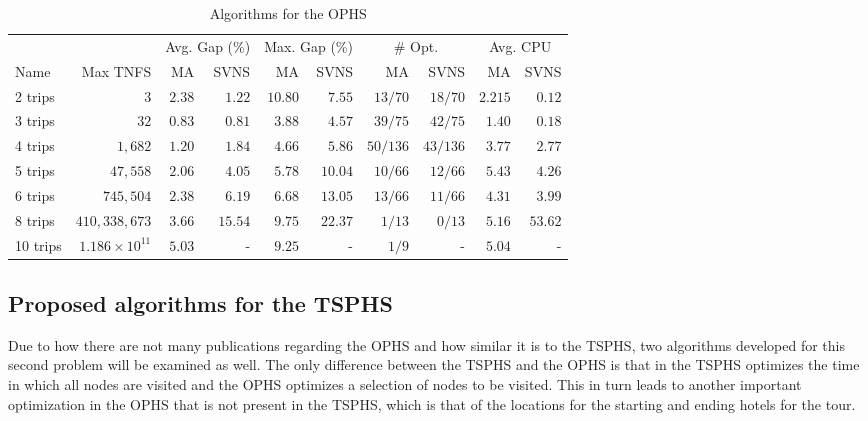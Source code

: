     \begin{center}
        \begin{table}[]
            \centering
            \begin{tabular}{|lr|rr|rr|rr|rr|}
                \hline \multicolumn{2}{|c|}{} & 
                \multicolumn{2}{c|}{Avg. Gap (\%)} & \multicolumn{2}{c|}{Max. Gap (\%)} &
                \multicolumn{2}{c|}{\# Opt.} &
                \multicolumn{2}{c|}{Avg. CPU}\\
                Name & Max TNFS & MA & SVNS & MA & SVNS & MA & SVNS & MA & SVNS  \\
                \hline
                2 trips  & $3$ & $2.38$ & $1.22$ & $10.80$ & $7.55$ & $13/70$ & $18/70$ & $2.215$ & $0.12$ \\
                3 trips  & $32$ & $0.83$ & $0.81$ & $3.88$ & $4.57$ & $39/75$ & $42/75$ & $1.40$ & $0.18$ \\
                4 trips  & $1,682$ & $1.20$ & $1.84$ & $4.66$ & $5.86$ & $50/136$ & $43/136$ & $3.77$ & $2.77$ \\
                5 trips  & $47,558$ & $2.06$ & $4.05$ & $5.78$ & $10.04$ & $10/66$ & $12/66$ & $5.43$ & $4.26$ \\
                6 trips  & $745,504$ & $2.38$ & $6.19$ & $6.68$ & $13.05$ & $13/66$ & $11/66$ & $4.31$ & $3.99$ \\
                8 trips  & $410,338,673$ & $3.66$ & $15.54$ & $9.75$ & $22.37$ & $1/13$ & $0/13$ & $5.16$ & $53.62$ \\
                10 trips & $1.186\times10^{11}$ & $5.03$ & - & $9.25$ & - & $1/9$ & - & $5.04$ & - \\
                \hline
            \end{tabular}  
            \caption{Algorithms for the OPHS}
            \label{TSPHS comparison}
        \end{table}
    \end{center}

\subsection{Proposed algorithms for the TSPHS}

    Due to how there are not many publications regarding the OPHS and how similar it is to the TSPHS, two algorithms developed for this second problem will be examined as well. The only difference between the TSPHS and the OPHS is that in the TSPHS optimizes the time in which all nodes are visited and the OPHS optimizes a selection of nodes to be visited. This in turn leads to another important optimization in the OPHS that is not present in the TSPHS, which is that of the locations for the starting and ending hotels for the tour.
    
